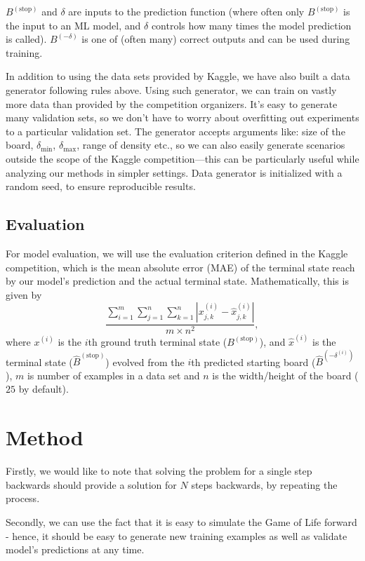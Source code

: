 \documentclass[conference]{IEEEtran}
\begin{document}
$B^{(\text{stop})}$ and $\delta$ are inputs to the prediction function (where often only $B^{(\text{stop})}$ is the input to an ML model, and $\delta$ controls how many times the model prediction is called). $B^{(-\delta)}$ is one of (often many) correct outputs and can be used during training.

In addition to using the data sets provided by Kaggle, we have also built a data generator following rules above. Using such generator, we can train on vastly more data than provided by the competition organizers. It's easy to generate many validation sets, so we don't have to worry about overfitting out experiments to a particular validation set. The generator accepts arguments like: size of the board, $\delta_{\min}$, $\delta_{\max}$, range of density etc., so we can also easily generate scenarios outside the scope of the Kaggle competition---this can be particularly useful while analyzing our methods in simpler settings. Data generator is initialized with a random seed, to ensure reproducible results.

\subsection{Evaluation}
\label{evaluation}
For model evaluation, we will use the evaluation criterion defined in the Kaggle competition, which is the mean absolute error (MAE) of the terminal state reach by our model's prediction and the actual terminal state. Mathematically, this is given by $$\frac{\sum_{i=1}^{m}\sum_{j=1}^{n}\sum_{k=1}^{n}|x_{j,k}^{(i)} - \hat x_{j,k}^{(i)}|}{m \times n^2},$$ where $x^{(i)}$ is the $i$th ground truth terminal state ($B^{(\text{stop})}$), and $\hat x^{(i)}$ is the terminal state ($\hat B^{(\text{stop})}$) evolved from the $i$th predicted starting board ($\hat B^{(-\delta^{(i)})}$), $m$ is number of examples in a data set and $n$ is the width/height of the board ($25$ by default).

\section{Method}

Firstly, we would like to note that solving the problem for a single step backwards should provide a solution for $N$ steps backwards, by repeating the process.

Secondly, we can use the fact that it is easy to simulate the Game of Life forward - hence, it should be easy to generate new training examples as well as validate model's predictions at any time.
\end{document}
